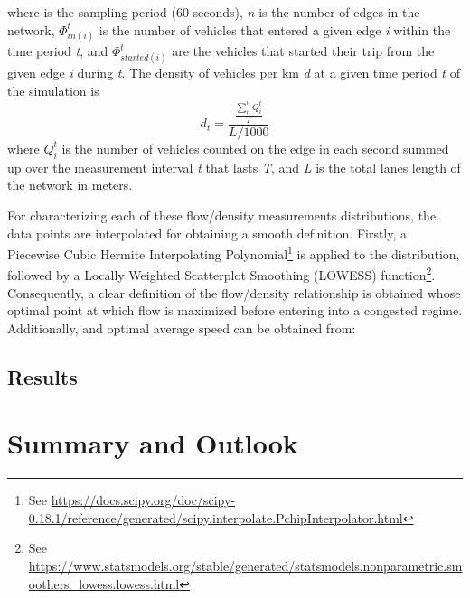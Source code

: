 \documentclass[11pt]{article}
\begin{document}
where  is the sampling period (60 seconds), \textit{n} is the number of edges in the network, $\Phi_{in(i)}^t$ is the number of vehicles that entered a given edge \textit{i} within the time period \textit{t}, and $\Phi_{started(i)}^t$ are the vehicles that started their trip from the given edge \textit{i} during \textit{t}.
The density of vehicles per km \textit{d} at a given time period \textit{t} of the simulation is
\begin{equation}
    d_t= \frac{\frac{\sum_{n}^{i}Q_{i}^t}{T}}{L/1000}
\end{equation}
where $Q_{i}^t$ is the number of vehicles counted on the edge in each second summed up over the measurement interval \textit{t} that lasts \textit{T}, and \textit{L} is the total lanes length of the network in meters.

For characterizing each of these flow/density measurements distributions, the data points are interpolated for obtaining a smooth definition. Firstly, a Piecewise Cubic Hermite Interpolating Polynomial\footnote{See \url{https://docs.scipy.org/doc/scipy-0.18.1/reference/generated/scipy.interpolate.PchipInterpolator.html}} is applied to the distribution, followed by a Locally Weighted Scatterplot Smoothing (LOWESS) function\footnote{See \url{https://www.statsmodels.org/stable/generated/statsmodels.nonparametric.smoothers_lowess.lowess.html}}. Consequently, a clear definition of the flow/density relationship is obtained whose optimal point at which flow is maximized before entering into a congested regime. Additionally, and optimal average speed can be obtained from: 



\subsection{Results}

\begin{table}[htbp]
\centering
\caption{Results. Optimal points for each network simulation.}
\label{tab:results-tip-points}
\end{table}






\section{Summary and Outlook}



\end{document}
